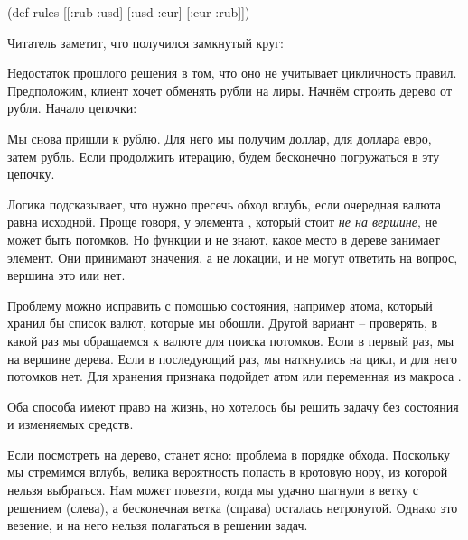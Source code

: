 \begin{english}
  \begin{clojure}
(def rules
  [[:rub :usd]
   [:usd :eur]
   [:eur :rub]])
  \end{clojure}
\end{english}

Читатель заметит, что получился замкнутый круг:

\begin{figure}[H]
  \centering
  
  \label{fig:chart-zip-18}
\end{figure}

Недостаток прошлого решения в том, что оно не учитывает цикличность
правил. Предположим, клиент хочет обменять рубли на лиры. Начнём строить дерево
от рубля. Начало цепочки:

\begin{figure}[H]
  \centering
  
  \label{fig:chart-zip-19}
\end{figure}

Мы снова пришли к рублю. Для него мы получим доллар, для доллара евро, затем
рубль. Если продолжить итерацию, будем бесконечно погружаться в эту цепочку.

Логика подсказывает, что нужно пресечь обход вглубь, если очередная валюта равна
исходной. Проще говоря, у элемента , который стоит \emph{не на вершине}, не
может быть потомков. Но функции  и  не знают, какое
место в дереве занимает элемент. Они принимают значения, а не локации, и не
могут ответить на вопрос, вершина это или нет.


Проблему можно исправить с помощью состояния, например атома, который хранил бы
список валют, которые мы обошли. Другой вариант – проверять, в какой раз мы
обращаемся к валюте  для поиска потомков. Если в первый раз, мы на
вершине дерева. Если в последующий раз, мы наткнулись на цикл, и для него
потомков нет. Для хранения признака подойдет атом или переменная из макроса
.

Оба способа имеют право на жизнь, но хотелось бы решить задачу без состояния и
изменяемых средств.

Если посмотреть на дерево, станет ясно: проблема в порядке обхода. Поскольку мы
стремимся вглубь, велика вероятность попасть в кротовую нору, из которой нельзя
выбраться. Нам может повезти, когда мы удачно шагнули в ветку с решением
(слева), а бесконечная ветка (справа) осталась нетронутой. Однако это везение, и
на него нельзя полагаться в решении задач.

